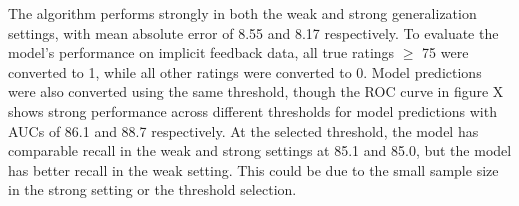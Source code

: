 \documentclass{article}
\begin{document}
The algorithm performs strongly in both the weak and strong generalization
 settings, with mean absolute error of 8.55 and 8.17 respectively.
To evaluate the model's performance on implicit feedback data, all true ratings
 $\geq$ 75 were converted to 1, while all other ratings were converted to 0.
Model predictions were also converted using the same threshold, though the ROC
 curve in figure X shows strong performance across different thresholds for
 model predictions with AUCs of 86.1 and 88.7 respectively.
At the selected threshold, the model has comparable recall in the weak and
 strong settings at 85.1 and 85.0, but the model has better recall in the weak
 setting.
This could be due to the small sample size in the strong setting or the
 threshold selection.

\newpage


\end{document}
